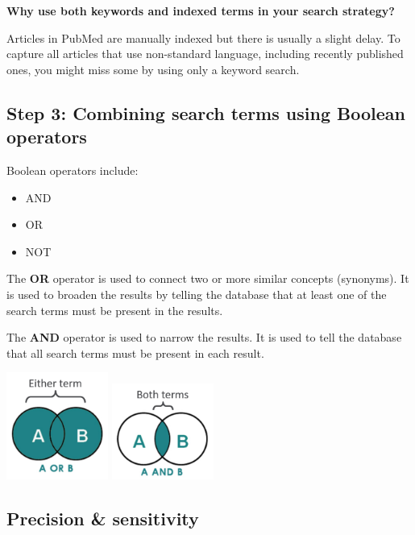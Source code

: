 \documentclass[
]{book}
\begin{document}
\textbf{Why use both keywords and indexed terms in your search strategy?}

Articles in PubMed are manually indexed but there is usually a slight delay. To capture all articles that use non-standard language, including recently published ones, you might miss some by using only a keyword search.

\hypertarget{step-3-combining-search-terms-using-boolean-operators}{%
\subsection{Step 3: Combining search terms using Boolean operators}\label{step-3-combining-search-terms-using-boolean-operators}}

Boolean operators include:

\begin{itemize}
\item
  AND
\item
  OR
\item
  NOT
\end{itemize}

The \textbf{OR} operator is used to connect two or more similar concepts (synonyms). It is used to broaden the results by telling the database that at least one of the search terms must be present in the results.

The \textbf{AND} operator is used to narrow the results. It is used to tell the database that all search terms must be present in each result.

\includegraphics[width=0.25\textwidth,height=0.25\textheight]{figs/booleanOR.png}
\includegraphics[width=0.25\textwidth,height=0.25\textheight]{figs/booleanAND.png}

\hypertarget{precision-sensitivity}{%
\subsection{Precision \& sensitivity}\label{precision-sensitivity}}
\end{document}
